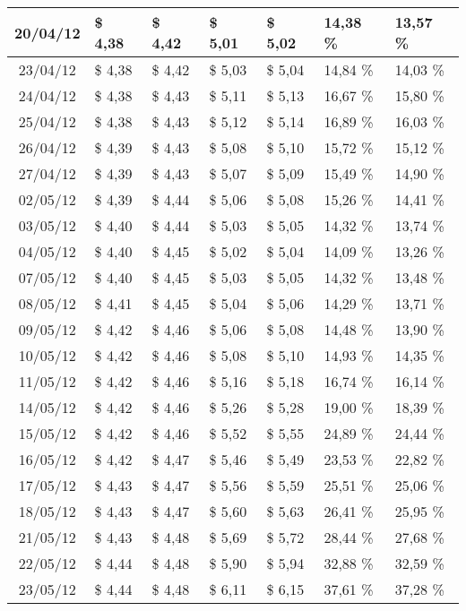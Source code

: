 \begin{center}
\begin{longtable}{|c|p{1.5cm}|p{1.5cm}|p{1.5cm}|p{1.5cm}|p{1.5cm}|p{1.5cm}|}
20/04/12 & \$ 4,38 & \$ 4,42 & \$ 5,01 & \$ 5,02 & 14,38 \% & 13,57 \% \\ \hline
23/04/12 & \$ 4,38 & \$ 4,42 & \$ 5,03 & \$ 5,04 & 14,84 \% & 14,03 \% \\ \hline
24/04/12 & \$ 4,38 & \$ 4,43 & \$ 5,11 & \$ 5,13 & 16,67 \% & 15,80 \% \\ \hline
25/04/12 & \$ 4,38 & \$ 4,43 & \$ 5,12 & \$ 5,14 & 16,89 \% & 16,03 \% \\ \hline
26/04/12 & \$ 4,39 & \$ 4,43 & \$ 5,08 & \$ 5,10 & 15,72 \% & 15,12 \% \\ \hline
27/04/12 & \$ 4,39 & \$ 4,43 & \$ 5,07 & \$ 5,09 & 15,49 \% & 14,90 \% \\ \hline
02/05/12 & \$ 4,39 & \$ 4,44 & \$ 5,06 & \$ 5,08 & 15,26 \% & 14,41 \% \\ \hline
03/05/12 & \$ 4,40 & \$ 4,44 & \$ 5,03 & \$ 5,05 & 14,32 \% & 13,74 \% \\ \hline
04/05/12 & \$ 4,40 & \$ 4,45 & \$ 5,02 & \$ 5,04 & 14,09 \% & 13,26 \% \\ \hline
07/05/12 & \$ 4,40 & \$ 4,45 & \$ 5,03 & \$ 5,05 & 14,32 \% & 13,48 \% \\ \hline
08/05/12 & \$ 4,41 & \$ 4,45 & \$ 5,04 & \$ 5,06 & 14,29 \% & 13,71 \% \\ \hline
09/05/12 & \$ 4,42 & \$ 4,46 & \$ 5,06 & \$ 5,08 & 14,48 \% & 13,90 \% \\ \hline
10/05/12 & \$ 4,42 & \$ 4,46 & \$ 5,08 & \$ 5,10 & 14,93 \% & 14,35 \% \\ \hline
11/05/12 & \$ 4,42 & \$ 4,46 & \$ 5,16 & \$ 5,18 & 16,74 \% & 16,14 \% \\ \hline
14/05/12 & \$ 4,42 & \$ 4,46 & \$ 5,26 & \$ 5,28 & 19,00 \% & 18,39 \% \\ \hline
15/05/12 & \$ 4,42 & \$ 4,46 & \$ 5,52 & \$ 5,55 & 24,89 \% & 24,44 \% \\ \hline
16/05/12 & \$ 4,42 & \$ 4,47 & \$ 5,46 & \$ 5,49 & 23,53 \% & 22,82 \% \\ \hline
17/05/12 & \$ 4,43 & \$ 4,47 & \$ 5,56 & \$ 5,59 & 25,51 \% & 25,06 \% \\ \hline
18/05/12 & \$ 4,43 & \$ 4,47 & \$ 5,60 & \$ 5,63 & 26,41 \% & 25,95 \% \\ \hline
21/05/12 & \$ 4,43 & \$ 4,48 & \$ 5,69 & \$ 5,72 & 28,44 \% & 27,68 \% \\ \hline
22/05/12 & \$ 4,44 & \$ 4,48 & \$ 5,90 & \$ 5,94 & 32,88 \% & 32,59 \% \\ \hline
23/05/12 & \$ 4,44 & \$ 4,48 & \$ 6,11 & \$ 6,15 & 37,61 \% & 37,28 \% \\ \hline

\end{longtable}
\end{center}
